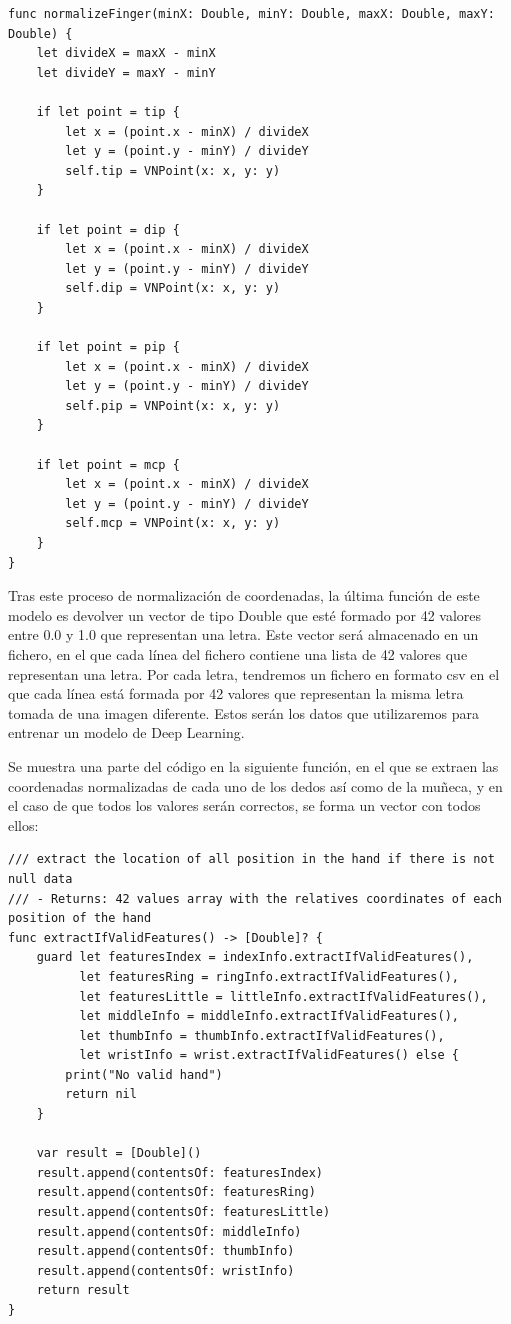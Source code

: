 \documentclass[../main.tex]{subfiles}
\begin{document}
\begin{itemize}
\begin{lstlisting}[style=swift]
func normalizeFinger(minX: Double, minY: Double, maxX: Double, maxY: Double) {
    let divideX = maxX - minX
    let divideY = maxY - minY
    
    if let point = tip {
        let x = (point.x - minX) / divideX
        let y = (point.y - minY) / divideY
        self.tip = VNPoint(x: x, y: y)
    }
    
    if let point = dip {
        let x = (point.x - minX) / divideX
        let y = (point.y - minY) / divideY
        self.dip = VNPoint(x: x, y: y)
    }
    
    if let point = pip {
        let x = (point.x - minX) / divideX
        let y = (point.y - minY) / divideY
        self.pip = VNPoint(x: x, y: y)
    }
    
    if let point = mcp {
        let x = (point.x - minX) / divideX
        let y = (point.y - minY) / divideY
        self.mcp = VNPoint(x: x, y: y)
    }
}
\end{lstlisting}
\end{itemize}

Tras este proceso de normalización de coordenadas, la última función de este modelo es devolver un vector de tipo Double que esté formado por 42 valores entre 0.0 y 1.0 que representan una letra. Este vector será almacenado en un fichero, en el que cada línea del fichero contiene una lista de 42 valores que representan una letra. Por cada letra, tendremos un fichero en formato csv en el que cada línea está formada por 42 valores que representan la misma letra tomada de una imagen diferente. Estos serán los datos que utilizaremos para entrenar un modelo de Deep Learning.

Se muestra una parte del código en la siguiente función, en el que se extraen las coordenadas normalizadas de cada uno de los dedos así como de la muñeca, y en el caso de que todos los valores serán correctos, se forma un vector con todos ellos:


\begin{lstlisting}[style=swift]
/// extract the location of all position in the hand if there is not null data
/// - Returns: 42 values array with the relatives coordinates of each position of the hand
func extractIfValidFeatures() -> [Double]? {
    guard let featuresIndex = indexInfo.extractIfValidFeatures(),
          let featuresRing = ringInfo.extractIfValidFeatures(),
          let featuresLittle = littleInfo.extractIfValidFeatures(),
          let middleInfo = middleInfo.extractIfValidFeatures(),
          let thumbInfo = thumbInfo.extractIfValidFeatures(),
          let wristInfo = wrist.extractIfValidFeatures() else {
        print("No valid hand")
        return nil
    }
    
    var result = [Double]()
    result.append(contentsOf: featuresIndex)
    result.append(contentsOf: featuresRing)
    result.append(contentsOf: featuresLittle)
    result.append(contentsOf: middleInfo)
    result.append(contentsOf: thumbInfo)
    result.append(contentsOf: wristInfo)
    return result
}
\end{lstlisting}
\end{document}
